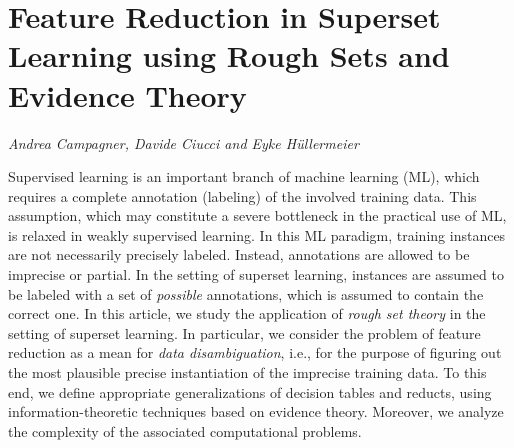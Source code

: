 \documentclass[../booklet.tex]{subfiles}
\begin{document}
\section[Feature Reduction in Superset Learning using Rough Sets and Evidence Theory. {\it Andrea Campagner, Davide Ciucci and Eyke Hüllermeier}]{Feature Reduction in Superset Learning using Rough Sets and Evidence Theory}
  

\begin{center}
  {\it Andrea Campagner, Davide Ciucci and Eyke Hüllermeier}
\end{center}

\vskip 0.8cm


Supervised learning is an important branch of machine learning (ML), which requires a complete annotation (labeling) of the involved training data. This assumption, which may constitute a severe bottleneck in the practical use of ML, is relaxed in weakly supervised learning. In this ML paradigm, training instances are not necessarily precisely labeled. Instead, annotations are allowed to be imprecise or partial. In the setting of superset learning,  instances are assumed to be labeled with a set of \emph{possible} annotations, which is assumed to contain the correct one.
In this article, we study the application of \emph{rough set theory} in the setting of superset learning. In particular, we consider the problem of feature reduction as a mean for \emph{data disambiguation}, i.e., for the purpose of figuring out the most plausible precise instantiation of the imprecise training data.
 To this end, we define appropriate generalizations of decision tables and reducts, using information-theoretic techniques based on evidence theory. Moreover, we analyze the complexity of the associated computational problems.
\end{document}
